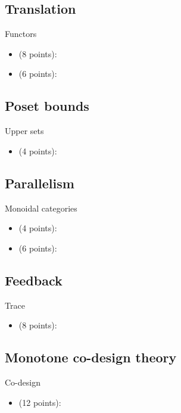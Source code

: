 \subsection{Translation}

Functors
\begin{itemize}
    \item {} (8 points): 
    \item {} (6 points): 
\end{itemize}

\subsection{Poset bounds}
Upper sets
\begin{itemize}
    \item {} (4 points): 
\end{itemize}

\subsection{Parallelism}

Monoidal categories
\begin{itemize}
    \item {} (4 points): 
    \item {} (6 points): 
\end{itemize}

\subsection{Feedback}

Trace
\begin{itemize}
    \item {} (8 points): 
\end{itemize}

\subsection{Monotone co-design theory}

Co-design

\begin{itemize}
    \item {} (12 points): 
\end{itemize}

